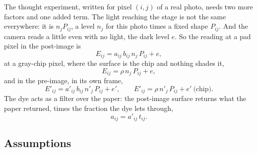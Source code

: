 \documentclass[11pt,letter]{article}
\begin{document}
The thought experiment, written for pixel $(i, j)$ of a real photo, needs
two more factors and one added term.  The light reaching the stage is not
the same everywhere: it is $n_j P_{ij}$, a level $n_j$ for this photo times
a fixed shape $P_{ij}$.  And the camera reads a little even with no light,
the dark level $e$.  So the reading at a pad pixel in the post-image is
\begin{equation}
  E_{ij} = a_{ij}\, b_{ij}\, n_j\, P_{ij} + e ,
  \label{eq:model-pad}
\end{equation}
at a gray-chip pixel, where the surface is the chip and nothing shades it,
\begin{equation}
  E_{ij} = \rho\, n_j\, P_{ij} + e ,
  \label{eq:model-chip}
\end{equation}
and in the pre-image, in its own frame,
\begin{equation}
  E'_{ij} = a'_{ij}\, b_{ij}\, n'_j\, P_{ij} + e' , \qquad
  E'_{ij} = \rho\, n'_j\, P_{ij} + e' \ \text{(chip)}.
  \label{eq:model-pre}
\end{equation}
The dye acts as a filter over the paper: the post-image surface returns
what the paper returned, times the fraction the dye lets through,
\begin{equation}
  a_{ij} = a'_{ij}\, t_{ij} .
  \label{eq:dye}
\end{equation}

\subsection*{Assumptions}
\end{document}

